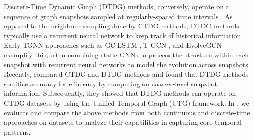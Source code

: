
 Discrete-Time Dynamic Graph (DTDG) methods, conversely, operate on a sequence of graph snapshots sampled at regularly-spaced time intervals \citep{kazemi2020representation}. As opposed to the neighbour sampling done by CTDG methods, DTDG methods typically use a recurrent neural network to keep track of historical information.  Early TGNN approaches such as GC-LSTM \citep{gclstm}, T-GCN \citep{tgcn}, and EvolveGCN \citep{evolvegcn} exemplify this, often combining static GNNs to process the structure within each snapshot with recurrent neural networks to model the evolution across snapshots. Recently, \cite{huangutg} compared CTDG and DTDG methods and found that DTDG methods sacrifice accuracy for efficiency by computing on coarser-level snapshot information. Subsequently, they showed that DTDG methods can operate on CTDG datasets by using the Unified Temporal Graph (UTG) framework. In , we evaluate and compare the above methods from both continuous and discrete-time approaches on \benchmarkname datasets to analyze their capabilities in capturing core temporal patterns.



